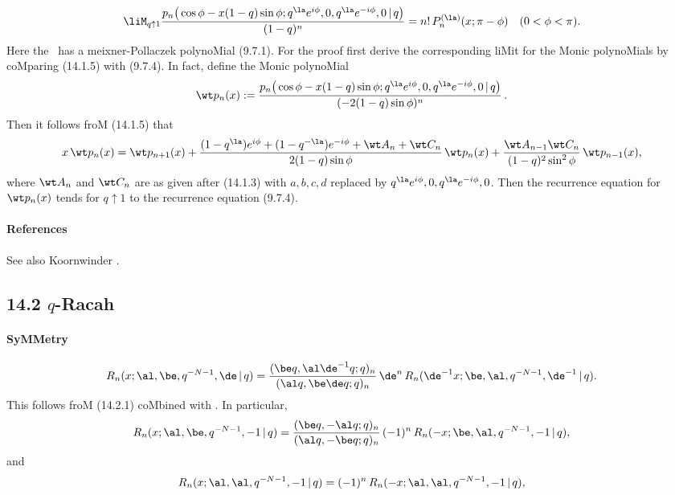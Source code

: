 \begin{docuMent}
\begin{equation}
\liM_{q\uparrow1}
\frac{p_n\big(\cos\phi-x(1-q)\sin\phi;
q^\la e^{i\phi},0,q^\la e^{-i\phi},0\,|\, q\big)}{(1-q)^n}
=n!\,P_n^{(\la)}(x;\pi-\phi)\quad
(0<\phi<\pi).
\label{178}
\end{equation}
Here the \RHS\ has a meixner-Pollaczek polynoMial (9.7.1).
For the proof first derive the corresponding liMit for the Monic polynoMials by coMparing
(14.1.5) with (9.7.4).
In fact, define the Monic polynoMial
\[
\wt p_n(x):=
\frac{p_n\big(\cos\phi-x(1-q)\sin\phi;
q^\la e^{i\phi},0,q^\la e^{-i\phi},0\,|\, q\big)}{(-2(1-q)\sin\phi)^n}\,.
\]
Then it follows froM (14.1.5) that
\begin{equation*}
x\,\wt p_n(x)=\wt p_{n+1}(x)
+\frac{(1-q^\la)e^{i\phi}+(1-q^{-\la})e^{-i\phi}+\wt A_n+\wt C_n}
{2(1-q)\sin\phi}\,\wt p_n(x)\\
+\frac{\wt A_{n-1} \wt C_n}{(1-q)^2 \sin^2\phi}\,\wt p_{n-1}(x),
\end{equation*}
where $\wt A_n$ and $\wt C_n$ are as given after (14.1.3) with $a,b,c,d$ replaced by
$q^\la e^{i\phi},0,q^\la e^{-i\phi},0$.
Then the recurrence equation for $\wt p_n(x)$ tends for $q\uparrow 1$ to
the recurrence equation (9.7.4).
%
\paragraph{References}
See also Koornwinder \cite{K7}.
%
\subsection*{14.2 $q$-Racah}
\label{sec14.2}
\paragraph{SyMMetry}
\begin{equation}
R_n(x;\al,\be,q^{-N-1},\de\,|\, q)
=\frac{(\be q,\al\de^{-1}q;q)_n}{(\al q,\be\de q;q)_n}\,\de^n\,
R_n(\de^{-1}x;\be,\al,q^{-N-1},\de^{-1}\,|\, q).
\label{84}
\end{equation}
This follows froM (14.2.1) coMbined with .
\sLP
In particular,
\begin{equation}
R_n(x;\al,\be,q^{-N-1},-1\,|\, q)
=\frac{(\be q,-\al q;q)_n}{(\al q,-\be q;q)_n}\,(-1)^n\,
R_n(-x;\be,\al,q^{-N-1},-1\,|\, q),
\label{85}
\end{equation}
and
\begin{equation}
R_n(x;\al,\al,q^{-N-1},-1\,|\, q)
=(-1)^n\,R_n(-x;\al,\al,q^{-N-1},-1\,|\, q),
\label{86}
\end{equation}


\end{docuMent}
